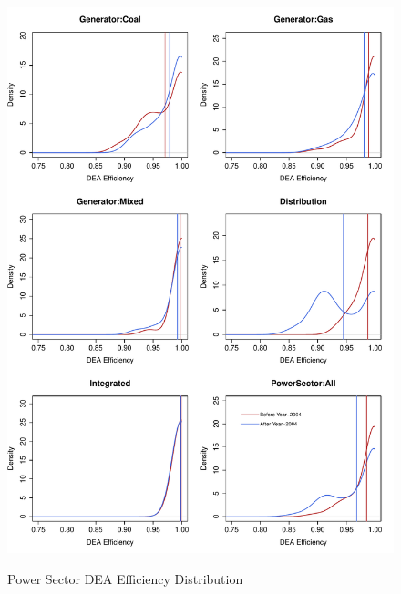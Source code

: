 \begin{figure}[ht]
	\centering
	\caption{Power Sector DEA Efficiency Distribution}
		\includegraphics[width=1.00\textwidth]{chapter03/DEAEfficiency.pdf}
	\label{fig:DEAEfficiency}
\end{figure}

